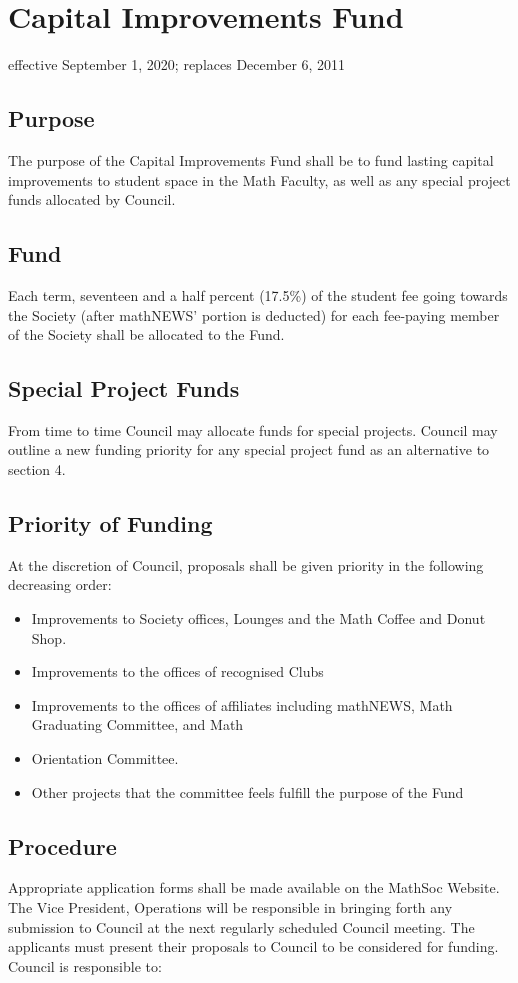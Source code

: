 \section{Capital Improvements Fund}
effective September 1, 2020; replaces December 6, 2011

\subsection{Purpose}
The purpose of the Capital Improvements Fund shall be to fund lasting capital improvements to student space in the Math Faculty, as well as any special project funds allocated by Council.

\subsection{Fund}

Each term, seventeen and a half percent (17.5\%) of the student fee going towards the 
Society (after mathNEWS’ portion is deducted) for each fee-paying member of the 
Society shall be allocated to the Fund.

\subsection{Special Project Funds}
From time to time Council may allocate funds for special projects. Council may outline a new funding priority for any special project fund as an alternative to section 4.

\subsection{Priority of Funding}
At the discretion of Council, proposals shall be given priority in the following decreasing order:\
\begin{itemize}
\item Improvements to Society offices, Lounges and the Math Coffee and Donut Shop.
\item Improvements to the offices of recognised Clubs
\item Improvements to the offices of affiliates including mathNEWS, Math Graduating Committee, and Math \item Orientation Committee.
\item Other projects that the committee feels fulfill the purpose of the Fund
\end{itemize}

\subsection{Procedure}
Appropriate application forms shall be made available on the MathSoc Website. The Vice
President, Operations will be responsible in bringing forth any submission to Council 
at the next regularly scheduled Council meeting. The applicants must present their 
proposals to Council to be considered for funding. Council is responsible to:

